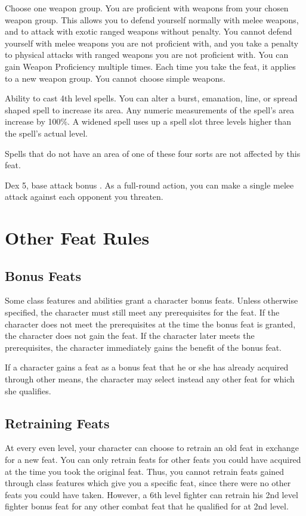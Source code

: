 Choose one weapon group.
 You are proficient with weapons from your chosen weapon group. This allows you to defend yourself normally with melee weapons, and to attack with exotic ranged weapons without penalty.
 You cannot defend yourself with melee weapons you are not proficient with, and you take a  penalty to physical attacks with ranged weapons you are not proficient with.
 You can gain Weapon Proficiency multiple times. Each time you take the feat, it applies to a new weapon group. You cannot choose simple weapons.

 Ability to cast 4th level spells.
 You can alter a burst, emanation, line, or spread shaped spell to increase its area. Any numeric measurements of the spell's area increase by 100\%. A widened spell uses up a spell slot three levels higher than the spell's actual level.
\par Spells that do not have an area of one of these four sorts are not affected by this feat.

 Dex 5, base attack bonus .
 As a full-round action, you can make a single melee attack against each opponent you threaten.

\section{Other Feat Rules}

\subsection{Bonus Feats}
Some class features and abilities grant a character bonus feats. Unless otherwise specified, the character must still meet any prerequisites for the feat. If the character does not meet the prerequisites at the time the bonus feat is granted, the character does not gain the feat. If the character later meets the prerequisites, the character immediately gains the benefit of the bonus feat.

If a character gains a feat as a bonus feat that he or she has already acquired through other means, the character may select instead any other feat for which she qualifies.

\subsection{Retraining Feats}
At every even level, your character can choose to retrain an old feat in exchange for a new feat. You can only retrain feats for other feats you could have acquired at the time you took the original feat. Thus, you cannot retrain feats gained through class features which give you a specific feat, since there were no other feats you could have taken. However, a 6th level fighter can retrain his 2nd level fighter bonus feat for any other combat feat that he qualified for at 2nd level.
